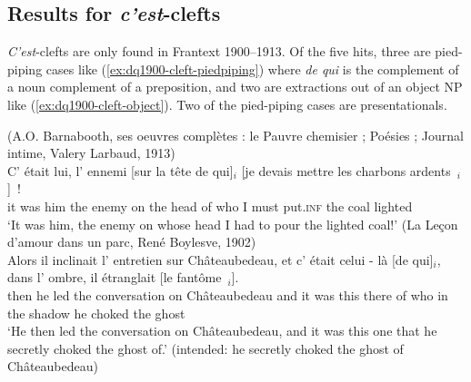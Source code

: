 \subsection{Results for \emph{c'est}-clefts}

\textit{C'est}-clefts are only found in Frantext 1900--1913. Of the five hits, three are pied-piping cases like (\ref{ex:dq1900-cleft-piedpiping}) where \emph{de qui} is the complement of a noun complement of a preposition, and two are extractions out of an object NP like (\ref{ex:dq1900-cleft-object}). Two of the pied-piping cases are presentationals.

\eal 
\ex (A.O. Barnabooth, ses oeuvres complètes : le Pauvre chemisier ; Poésies ; Journal intime, Valery Larbaud, 1913)\\
\gll C' était lui, l' ennemi [sur la tête de qui]$_i$ [je devais mettre les charbons ardents~\trace{}$_i$]~!\\
it was him the enemy on the head of who I must put\textsc{.inf} the coal lighted\\
\glt `It was him, the enemy on whose head I had to pour the lighted coal!'
\label{ex:dq1900-cleft-piedpiping}
\ex (La Leçon d'amour dans un parc, René Boylesve, 1902)\\
\gll Alors il inclinait l' entretien sur Châteaubedeau, et c' était celui - là [de qui]$_i$, dans l' ombre, il étranglait [le fantôme~\trace{}$_i$].\\
then he led the conversation on Châteaubedeau and it was this {} there of who in the shadow he choked the ghost\\
\glt `He then led the conversation on Châteaubedeau, and it was this one that he secretly choked the ghost of.' (intended: he secretly choked the ghost of Châteaubedeau)
\label{ex:dq1900-cleft-object}
\zl 